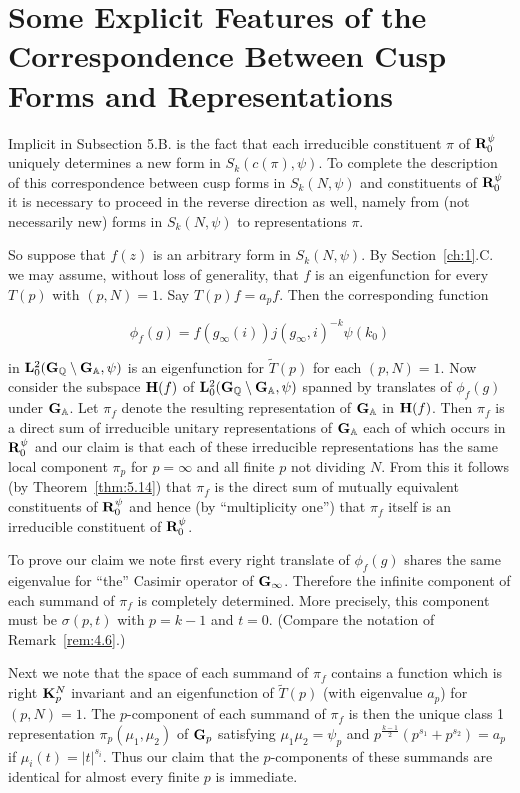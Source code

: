 \section{Some Explicit Features of the Correspondence Between Cusp Forms and Representations}\label{sec:5c}

Implicit in Subsection 5.B. is the fact that each irreducible constituent $\pi$ of $\mathbf{R}_0^{\psi}$ uniquely determines a new form in $S_k(c(\pi),\psi)$. To complete the description of this correspondence between cusp forms in $S_k(N,\psi)$ and constituents of $\mathbf{R}_0^{\psi}$ it is necessary to proceed in the reverse direction as well, namely from (not necessarily new) forms in $S_k(N,\psi)$ to representations $\pi$.

So suppose that $f(z)$ is an arbitrary form in $S_k(N, \psi)$. By Section~\ref{ch:1}.C. we may assume, without loss of generality, that $f$ is an eigenfunction for every $T(p)$ with $(p, N) = 1$. Say $T(p)f = a_p f$. Then the corresponding function

\[
\phi_f(g) = f(g_{\infty}(i)) j(g_{\infty}, i)^{-k} \psi(k_0)
\]

in $\mathbf{L}_0^2(\mathbf{G}_{\mathbb{Q}} \setminus \mathbf{G}_{\mathbb{A}}, \psi)$ is an eigenfunction for $\widetilde{T}(p)$ for each $(p, N) = 1$. Now consider the subspace $\mathbf{H}(f)$ of $\mathbf{L}_0^2(\mathbf{G}_{\mathbb{Q}} \setminus \mathbf{G}_{\mathbb{A}}, \psi)$ spanned by translates of $\phi_f(g)$ under $\mathbf{G}_{\mathbb{A}}$. Let $\pi_f$ denote the resulting representation of $\mathbf{G}_{\mathbb{A}}$ in $\mathbf{H}(f)$. Then $\pi_f$ is a direct sum of irreducible unitary representations of $\mathbf{G}_{\mathbb{A}}$ each of which occurs in $\mathbf{R}_0^{\psi}$ and our claim is that each of these irreducible representations has the same local component $\pi_p$ for $p = \infty$ and all finite $p$ not dividing $N$. From this it follows (by Theorem~\ref{thm:5.14}) that $\pi_f$ is the direct sum of mutually equivalent constituents of $\mathbf{R}_0^{\psi}$ and hence (by ``multiplicity one'') that $\pi_f$ itself is an irreducible constituent of $\mathbf{R}_0^{\psi}$.

To prove our claim we note first every right translate of $\phi_f(g)$ shares the same eigenvalue for ``the'' Casimir operator of $\mathbf{G}_{\infty}$. Therefore the infinite component of each summand of $\pi_f$ is completely determined. More precisely, this component must be $\sigma(p, t)$ with $p = k-1$ and $t = 0$. (Compare the notation of Remark~\ref{rem:4.6}.)

Next we note that the space of each summand of $\pi_f$ contains a function which is right $\mathbf{K}_p^N$ invariant and an eigenfunction of $\widetilde{T}(p)$ (with eigenvalue $a_p$) for $(p, N) = 1$. The $p$-component of each summand of $\pi_f$ is then the unique class 1 representation $\pi_p(\mu_1, \mu_2)$ of $\mathbf{G}_p$ satisfying $\mu_1\mu_2 = \psi_p$ and $p^{\frac{k-1}{2}}(p^{s_1} + p^{s_2}) = a_p$ if $\mu_i(t) = |t|^{s_i}$. Thus our claim that the $p$-components of these summands are identical for almost every finite $p$ is immediate.

